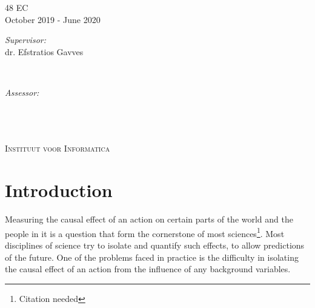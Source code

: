 \documentclass{article}
\newcommand{\red}[1]{{\color{red}{#1}}}
\begin{document}
\begin{titlepage}
48 EC\\ %
October 2019 - June 2020\\[1cm]%

\begin{minipage}[t]{0.4\textwidth}
\begin{flushleft} \large
\emph{Supervisor:} \\
dr. Efstratios Gavves%
\end{flushleft}
\end{minipage}
~
\begin{minipage}[t]{0.4\textwidth}
\begin{flushright} \large
\emph{Assessor:} \\
\red{Dr A  \textsc{Person}}\\
\end{flushright}
\end{minipage}\\[2cm]


\framebox{\rule{0pt}{2.5cm}\rule{2.5cm}{0pt}}\\[0.5cm]
\textsc{\large Instituut voor Informatica}\\[1.0cm] %
 

\vfill %

\end{titlepage}


\tableofcontents
\newpage

\section{Introduction}
Measuring the causal effect of an action on certain parts of the world and the people in it is a question that form the cornerstone of most sciences\footnote{\label{note:citation}Citation needed}. Most disciplines of science try to isolate and quantify such effects, to allow predictions of the future. One of the problems faced in practice is the difficulty in isolating the causal effect of an action from the influence of any background variables. 
\end{document}
